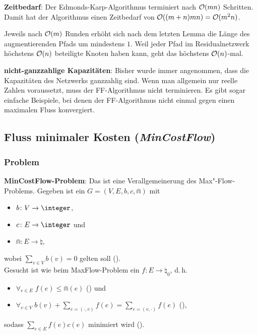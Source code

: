 \textbf{Zeitbedarf}:
Der Edmonds-Karp-Algorithmus terminiert nach $\mathcal{O}(mn)$ Schritten.\\
Damit hat der Algorithmus einen Zeitbedarf von $\mathcal{O}((m+n)mn) = \mathcal{O}(m^2 n)$.

\begin{Beweis}
    Jeweils nach $\mathcal{O}(m)$ Runden erhöht sich nach dem letzten Lemma die Länge des augmentierenden
    Pfads um mindestens $1$.
    Weil jeder Pfad im Residualnetzwerk höchstens $\mathcal{O}(n)$ beteiligte Knoten haben kann,
    geht das höchstens $\mathcal{O}(n)$-mal.
\end{Beweis}

\linie

\textbf{nicht-ganzzahlige Kapazitäten}:
Bisher wurde immer angenommen, dass die Kapazitäten des Netzwerks ganzzahlig sind.
Wenn man allgemein nur reelle Zahlen voraussetzt, muss der FF-Algorithmus nicht terminieren.
Es gibt sogar einfache Beispiele, bei denen der FF-Algorithmus nicht einmal gegen einen
maximalen Fluss konvergiert.

\pagebreak

\subsection{%
    Fluss minimaler Kosten (\emph{MinCostFlow})%
}

\subsubsection{%
    Problem%
}

\textbf{MinCostFlow-Problem}:
Das  ist eine Verallgemeinerung des Max"-Flow-Problems.
Gegeben ist ein  $G = (V, E, b, c, \Cap)$ mit
\begin{itemize}
    \item
     $b\colon V \to \integer$,
    
    \item
     $c\colon E \to \integer$ und
    
    \item
     $\Cap\colon E \to \natural$,
\end{itemize}
wobei $\sum_{v \in V} b(v) = 0$ gelten soll ().\\
Gesucht ist wie beim MaxFlow-Problem ein  $f\colon E \to \natural_0$,
d.\,h.
\begin{itemize}
    \item
    $\forall_{e \in E}\; f(e) \le \Cap(e)$
    () und
    
    \item
    $\forall_{v \in V}\;
    b(v) + \sum_{e = (\cdot, v)} f(e) = \sum_{e = (v, \cdot)} f(e)$
    (),
\end{itemize}
sodass $\sum_{e \in E} f(e)c(e)$ minimiert wird ().

